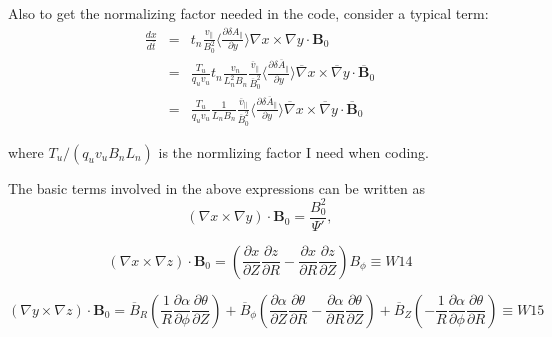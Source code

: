 \documentclass{article}
\begin{document}
Also to get the normalizing factor needed in the code, consider a typical
term:
\begin{eqnarray}
  \frac{d x}{d \overline{t}} & = & t_n \frac{v_{\parallel}}{B_0^2} \langle
  \frac{\partial \delta A_{\parallel}}{\partial y} \rangle \nabla x \times
  \nabla y \cdot \mathbf{B}_0 \nonumber\\
  & = & \frac{T_u}{q_u v_u} t_n \frac{v_n}{L_n^2 B_n}
  \frac{\overline{v}_{\parallel}}{\overline{B}_0^2} \langle \frac{\partial
  \delta \overline{A}_{\parallel}}{\partial y} \rangle \overline{\nabla} x
  \times \overline{\nabla} y \cdot \overline{\mathbf{B}}_0 \nonumber\\
  & = & \frac{T_u}{q_u v_u} \frac{1}{L_n B_n}
  \frac{\overline{v}_{\parallel}}{\overline{B}_0^2} \langle \frac{\partial
  \delta \overline{A}_{\parallel}}{\partial y} \rangle \overline{\nabla} x
  \times \overline{\nabla} y \cdot \overline{\mathbf{B}}_0 
\end{eqnarray}


where $T_u / (q_u v_u B_n L_n)$ is the normlizing factor I need when coding.

The basic terms involved in the above expressions can be written as
\begin{equation}
  (\nabla x \times \nabla y) \cdot \mathbf{B}_0 = \frac{B_0^2}{\Psi'},
\end{equation}

\begin{equation}
  (\nabla x \times \nabla z) \cdot \mathbf{B}_0 = \left( \frac{\partial
  x}{\partial Z} \frac{\partial z}{\partial R} - \frac{\partial x}{\partial R}
  \frac{\partial z}{\partial Z} \right) B_{\phi} \equiv W 14
\end{equation}



\begin{equation}
  (\nabla y \times \nabla z) \cdot \mathbf{B}_0 = \overline{B}_R \left(
  \frac{1}{R}  \frac{\partial \alpha}{\partial \phi} \frac{\partial
  \theta}{\partial Z} \right) + \overline{B}_{\phi} \left( \frac{\partial
  \alpha}{\partial Z} \frac{\partial \theta}{\partial R} - \frac{\partial
  \alpha}{\partial R} \frac{\partial \theta}{\partial Z} \right) +
  \overline{B}_Z \left( - \frac{1}{R}  \frac{\partial \alpha}{\partial \phi}
  \frac{\partial \theta}{\partial R} \right) \equiv W 15
\end{equation}


\

\

\
\end{document}
